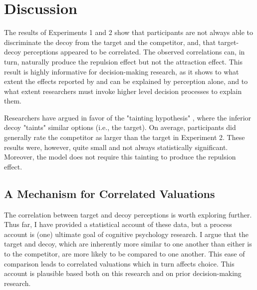 \section{Discussion}

The results of Experiments 1 and 2 show that participants are not always able to discriminate the decoy from the target and the competitor, and, that target-decoy perceptions appeared to be correlated. The observed correlations can, in turn, naturally produce the repulsion effect but not the attraction effect. This result is highly informative for decision-making research, as it shows to what extent the effects reported by \textcite{trueblood2013not} and \textcite{spektorWhenGoodLooks2018b} can be explained by perception alone, and to what extent researchers must invoke higher level decision processes to explain them. 

Researchers have argued in favor of the "tainting hypothesis" \parencite{simonson2014vices,spektorWhenGoodLooks2018b}, where the inferior decoy "taints" similar options (i.e., the target). On average, participants did generally rate the competitor as larger than the target in Experiment 2. These results were, however, quite small and not always statistically significant. Moreover, the model does not require this tainting to produce the repulsion effect.

\subsection{A Mechanism for Correlated Valuations}

The correlation between target and decoy perceptions is worth exploring further. Thus far, I have provided a statistical account of these data, but a process account is (one) ultimate goal of cognitive psychology research. I argue that the target and decoy, which are inherently more similar to one another than either is to the competitor, are more likely to be compared to one another. This ease of comparison leads to correlated valuations which in turn affects choice. This account is plausible based both on this research and on prior decision-making research.

